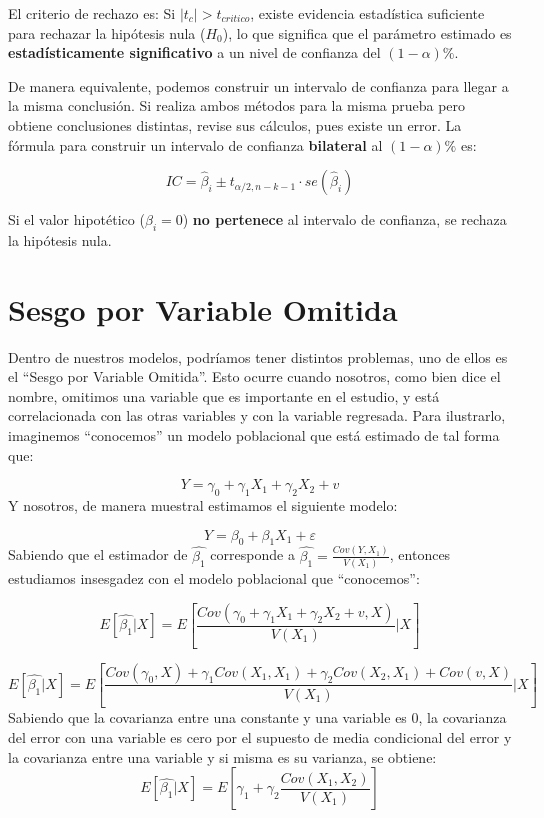 \documentclass[
]{book}
\begin{document}
El criterio de rechazo es: Si \(|t_c| > t_{critico}\), existe evidencia estadística suficiente para rechazar la hipótesis nula (\(H_0\)), lo que significa que el parámetro estimado es \textbf{estadísticamente significativo} a un nivel de confianza del \((1-\alpha)\%\).

De manera equivalente, podemos construir un intervalo de confianza para llegar a la misma conclusión. Si realiza ambos métodos para la misma prueba pero obtiene conclusiones distintas, revise sus cálculos, pues existe un error. La fórmula para construir un intervalo de confianza \textbf{bilateral} al \((1-\alpha)\%\) es:

\[IC = \hat{\beta}_i \pm t_{\alpha/2, n-k-1} \cdot se(\hat{\beta}_i)\]

Si el valor hipotético (\(\beta_i = 0\)) \textbf{no pertenece} al intervalo de confianza, se rechaza la hipótesis nula.

\section{Sesgo por Variable Omitida}\label{sesgo-por-variable-omitida}

Dentro de nuestros modelos, podríamos tener distintos problemas, uno de ellos es el ``Sesgo por Variable Omitida''. Esto ocurre cuando nosotros, como bien dice el nombre, omitimos una variable que es importante en el estudio, y está correlacionada con las otras variables y con la variable regresada. Para ilustrarlo, imaginemos ``conocemos'' un modelo poblacional que está estimado de tal forma que:

\[
Y = \gamma_0 + \gamma_1X_1 + \gamma_2X_2 + v
\]
Y nosotros, de manera muestral estimamos el siguiente modelo:

\[
Y = \beta_0 + \beta_1X_1 + \varepsilon
\]
Sabiendo que el estimador de \(\widehat{\beta_1}\) corresponde a \(\widehat{\beta_1} = \frac{Cov(Y,X_1)}{V(X_1)}\), entonces estudiamos insesgadez con el modelo poblacional que ``conocemos'':

\[
E[\widehat{\beta_1}|X] = E\left[\frac{Cov(\gamma_0 + \gamma_1X_1 + \gamma_2X_2 + v,X)}{V(X_1)}|X\right]
\]

\[
E[\widehat{\beta_1}|X] = E\left[\frac{Cov(\gamma_0,X) + \gamma_1Cov(X_1,X_1) + \gamma_2Cov(X_2,X_1) + Cov(v,X)}{V(X_1)}|X\right]
\]
Sabiendo que la covarianza entre una constante y una variable es 0, la covarianza del error con una variable es cero por el supuesto de media condicional del error y la covarianza entre una variable y si misma es su varianza, se obtiene:
\[
E[\widehat{\beta_1}|X] = E\left[\gamma_1 + \gamma_2\frac{Cov(X_1,X_2)}{V(X_1)}\right]
\]
\end{document}
